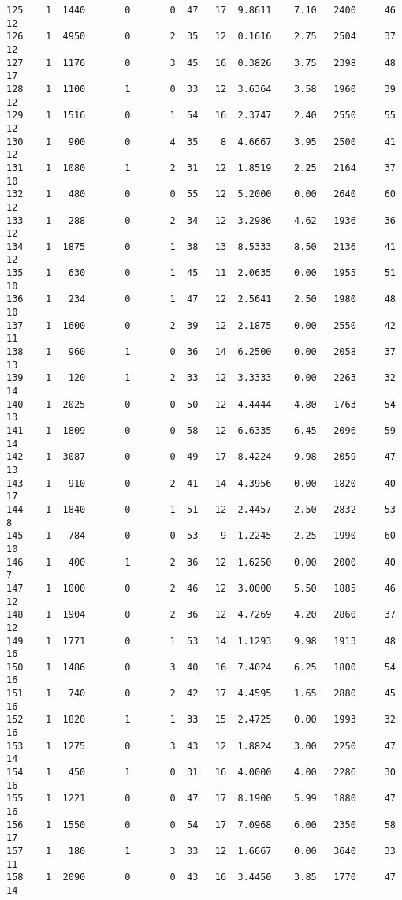 \documentclass[
  letterpaper,
  DIV=11,
  numbers=noendperiod]{scrreprt}
\begin{document}
\begin{verbatim}
125    1  1440       0       0  47   17  9.8611    7.10   2400     46      12
126    1  4950       0       2  35   12  0.1616    2.75   2504     37      12
127    1  1176       0       3  45   16  0.3826    3.75   2398     48      17
128    1  1100       1       0  33   12  3.6364    3.58   1960     39      12
129    1  1516       0       1  54   16  2.3747    2.40   2550     55      12
130    1   900       0       4  35    8  4.6667    3.95   2500     41      12
131    1  1080       1       2  31   12  1.8519    2.25   2164     37      10
132    1   480       0       0  55   12  5.2000    0.00   2640     60      12
133    1   288       0       2  34   12  3.2986    4.62   1936     36      12
134    1  1875       0       1  38   13  8.5333    8.50   2136     41      12
135    1   630       0       1  45   11  2.0635    0.00   1955     51      10
136    1   234       0       1  47   12  2.5641    2.50   1980     48      10
137    1  1600       0       2  39   12  2.1875    0.00   2550     42      11
138    1   960       1       0  36   14  6.2500    0.00   2058     37      13
139    1   120       1       2  33   12  3.3333    0.00   2263     32      14
140    1  2025       0       0  50   12  4.4444    4.80   1763     54      13
141    1  1809       0       0  58   12  6.6335    6.45   2096     59      14
142    1  3087       0       0  49   17  8.4224    9.98   2059     47      13
143    1   910       0       2  41   14  4.3956    0.00   1820     40      17
144    1  1840       0       1  51   12  2.4457    2.50   2832     53       8
145    1   784       0       0  53    9  1.2245    2.25   1990     60      10
146    1   400       1       2  36   12  1.6250    0.00   2000     40       7
147    1  1000       0       2  46   12  3.0000    5.50   1885     46      12
148    1  1904       0       2  36   12  4.7269    4.20   2860     37      12
149    1  1771       0       1  53   14  1.1293    9.98   1913     48      16
150    1  1486       0       3  40   16  7.4024    6.25   1800     54      16
151    1   740       0       2  42   17  4.4595    1.65   2880     45      16
152    1  1820       1       1  33   15  2.4725    0.00   1993     32      16
153    1  1275       0       3  43   12  1.8824    3.00   2250     47      14
154    1   450       1       0  31   16  4.0000    4.00   2286     30      16
155    1  1221       0       0  47   17  8.1900    5.99   1880     47      16
156    1  1550       0       0  54   17  7.0968    6.00   2350     58      17
157    1   180       1       3  33   12  1.6667    0.00   3640     33      11
158    1  2090       0       0  43   16  3.4450    3.85   1770     47      14

\end{verbatim}
\end{document}
